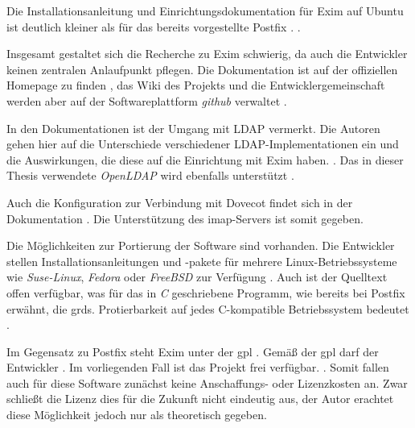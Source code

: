 Die Installationsanleitung und Einrichtungsdokumentation für Exim auf Ubuntu ist deutlich kleiner als für das bereits vorgestellte Postfix \citep[vgl.][]{eximubuntu}.  \citep[][]{eximubuntu}. 

Insgesamt gestaltet sich die Recherche zu Exim schwierig, da auch die Entwickler keinen zentralen Anlaufpunkt pflegen. Die Dokumentation ist auf der offiziellen Homepage zu finden \citep[vgl.][]{eximdoku}, das Wiki des Projekts und die Entwicklergemeinschaft werden aber auf der Softwareplattform \textit{github} verwaltet \citep[vgl.][]{eximwiki}. 

In den Dokumentationen ist der Umgang mit LDAP vermerkt. Die Autoren gehen hier auf die Unterschiede verschiedener LDAP-Implementationen ein und die Auswirkungen, die diese auf die Einrichtung mit Exim haben.  \citep[][14. More about LDAP]{eximldap}. Das in dieser Thesis verwendete \textit{OpenLDAP} wird ebenfalls unterstützt \citep[vgl.][14. More about LDAP]{eximldap}.

Auch die Konfiguration zur Verbindung mit Dovecot findet sich in der Dokumentation \citep[vgl.][]{eximdovecot}. Die Unterstützung des \ac{imap}-Servers ist somit gegeben.

Die Möglichkeiten zur Portierung der Software sind vorhanden. Die Entwickler stellen Installationsanleitungen und -pakete für mehrere Linux-Betriebssysteme wie \textit{Suse-Linux}, \textit{Fedora} oder \textit{FreeBSD} zur Verfügung \citep[vgl.][]{eximinstall}. 
Auch ist der Quelltext offen verfügbar, was für das in \textit{C} geschriebene Programm, wie bereits bei Postfix erwähnt, die grds. Protierbarkeit auf jedes C-kompatible Betriebssystem bedeutet \citep[vgl.][]{eximgit}. 

Im Gegensatz zu Postfix steht Exim unter der \ac{gpl} \citep[vgl.][]{eximhome}. Gemäß der \ac{gpl} darf der Entwickler  \citep[][4. Unveränderte Kopien]{gpldeutsch}. Im vorliegenden Fall ist das Projekt frei verfügbar.  \citep[][]{eximhome}.
Somit fallen auch für diese Software zunächst keine Anschaffungs- oder Lizenzkosten an. Zwar schließt die Lizenz dies für die Zukunft nicht eindeutig aus, der Autor erachtet diese Möglichkeit jedoch nur als theoretisch gegeben. 

